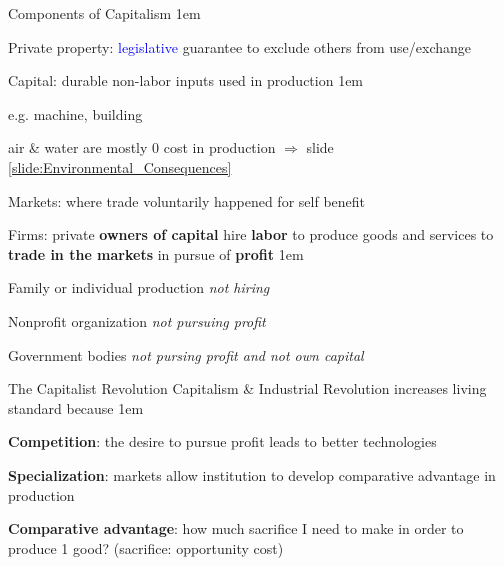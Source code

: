\documentclass[11pt,aspectratio=43,usenames,dvipsnames]{beamer}
\newcommand{\blue}[1]{\textcolor{blue}{#1}}
\let\olditemize=\itemize
\let\endolditemize=\enditemize
\renewenvironment{itemize}{\olditemize \itemsep1em}{\endolditemize}
\let\oldenumerate=\enumerate
\let\endoldenumerate=\endenumerate
\renewenvironment{enumerate}{\oldenumerate \itemsep1em}{ \endoldenumerate}
\theoremstyle{definition}
\begin{document}
\begin{frame}{Components of Capitalism}
\label{slide:Components_of_Capitalism}
    \begin{enumerate}
        \item Private property: \blue{legislative} guarantee to exclude others from use/exchange
        \item Capital: durable non-labor inputs used in production
        \begin{itemize}
            \item e.g. machine, building
            \item air \& water are mostly $ 0 $ cost in production $ \Rightarrow  $ slide \ref{slide:Environmental_Consequences}
        \end{itemize}
        \item Markets: where trade voluntarily happened for self benefit
        \item Firms: private \textbf{owners of capital} hire \textbf{labor} to produce goods and services to \textbf{trade in the markets} in pursue of \textbf{profit}
        \begin{itemize}
            \item Family or individual production \textit{not hiring}
            \item Nonprofit organization \textit{not pursuing profit}
            \item Government bodies \textit{not pursing profit and not own capital}
        \end{itemize}

    \end{enumerate}


\end{frame}

\begin{frame}{The Capitalist Revolution}
\label{slide:The_Capitalist_Revolution}
    Capitalism \& Industrial Revolution increases living standard because
    \begin{enumerate}
        \item \textbf{Competition}: the desire to pursue profit leads to better technologies
        \item \textbf{Specialization}: markets allow institution to develop \alert{comparative advantage} in production
        \item \textbf{Comparative advantage}: how much \alert{sacrifice} I need to make in order to produce \alert{1 good}? (sacrifice: opportunity cost)
    \end{enumerate}
\end{frame}
\end{document}
